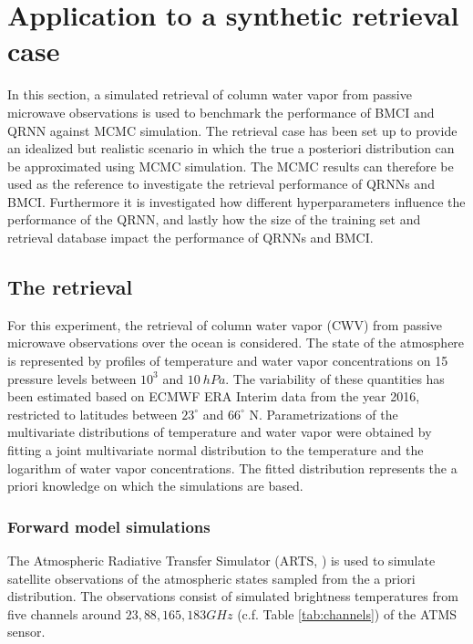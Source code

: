 \documentclass[journal abbreviation, manuscript]{copernicus}
\begin{document}
\section{Application to a synthetic retrieval case}
\label{sec:synthetic}

In this section, a simulated retrieval of column water vapor from passive
microwave observations is used to benchmark the performance of BMCI and QRNN
against MCMC simulation. The retrieval case has been set up to provide an
idealized but realistic scenario in which the true a posteriori distribution can
be approximated using MCMC simulation. The MCMC results can therefore be used as
the reference to investigate the retrieval performance of QRNNs and BMCI. Furthermore
it is investigated how different hyperparameters influence the performance of
the QRNN, and lastly how the size of the training set and retrieval database
impact the performance of QRNNs and BMCI.

\subsection{The retrieval}

   For this experiment, the retrieval of column water vapor (CWV) from passive
   microwave observations over the ocean is considered. The state of the
   atmosphere is represented by profiles of temperature and water vapor
   concentrations on 15 pressure levels between $10^3$ and $10\:\unit{hPa}$. The
   variability of these quantities has been estimated based on ECMWF ERA
   Interim data \citep{era_interim} from the year 2016, restricted to latitudes
   between $23^\circ$ and $66^\circ$ N. Parametrizations of the multivariate
   distributions of temperature and water vapor were obtained by fitting a joint
   multivariate normal distribution to the temperature and the logarithm of
   water vapor concentrations. The fitted distribution represents the a priori
   knowledge on which the simulations are based.

\subsubsection{Forward model simulations}

   The Atmospheric Radiative Transfer Simulator (ARTS, \citet{arts}) is used to
   simulate satellite observations of the atmospheric states sampled from the a
   priori distribution. The observations consist of simulated brightness
   temperatures from five channels around $23, 88, 165, 183 \unit{GHz}$
   (c.f. Table \ref{tab:channels}) of the ATMS sensor.
\end{document}
